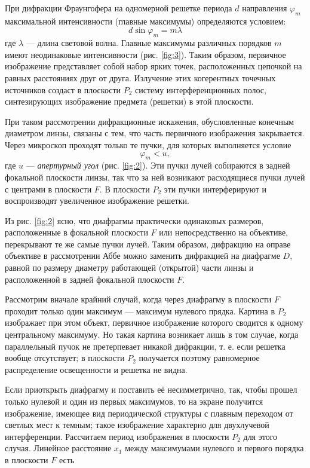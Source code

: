 \documentclass[a4paper, 12pt]{article}
\begin{document}
	При дифракции Фраунгофера на одномерной решетке периода $d$ направления $\varphi_m$ максимальной интенсивности (главные максимумы) определяются условием:
	\begin{equation}
		d\sin\varphi_m=m\lambda
		\label{eq:1}
	\end{equation}
	где $\lambda$ — длина световой волна. Главные максимумы различных порядков $m$ имеют неодинаковые интенсивности (рис. \ref{fig:3}). Таким образом, первичное изображение представляет собой набор ярких точек, расположенных цепочкой на равных расстояниях друг от друга. Излучение этих когерентных точечных источников создаст в плоскости $P_2$ систему интерференционных полос, синтезирующих изображение предмета (решетки) в этой плоскости.\par
	При таком рассмотрении дифракционные искажения, обусловленные конечным диаметром линзы, связаны с тем, что часть первичного изображения закрывается. Через микроскоп проходят только те пучки, для которых выполняется условие
	\begin{equation}
		\varphi_m<u,
	\end{equation}
	где $u$ — \textit{апертурный угол} (рис. \ref{fig:2}). Эти пучки лучей собираются в задней фокальной плоскости линзы, так что за ней возникают расходящиеся пучки лучей с центрами в плоскости $F$. В плоскости $P_2$ эти пучки интерферируют и воспроизводят увеличенное изображение решетки.\par
	Из рис. \ref{fig:2} ясно, что диафрагмы практически одинаковых размеров, расположенные в фокальной плоскости $F$ или непосредственно на объективе, перекрывают те же самые пучки лучей. Таким образом, дифракцию на оправе объективе в рассмотрении Аббе можно заменить дифракцией на диафрагме $D$, равной по размеру диаметру работающей (открытой) части линзы и расположенной в задней фокальной плоскости $F$.\par
	Рассмотрим вначале крайний случай, когда через диафрагму в плоскости $F$ проходит только один максимум — максимум нулевого прядка. Картина в $P_2$ изображает при этом объект, первичное изображение которого сводится к одному центральному максимуму. Но такая картина возникает лишь в том случае, когда параллельный пучок не претерпевает никакой дифракции, т. е. если решетка вообще отсутствует; в плоскости $P_2$ получается поэтому равномерное распределение освещенности и решетка не видна.\par
	Если приоткрыть диафрагму и поставить её несимметрично, так, чтобы прошел только нулевой и один из первых максимумов, то на экране получится изображение, имеющее вид периодической структуры с плавным переходом от светлых мест к темным; такое изображение характерно для двухлучевой интерференции. Рассчитаем период изображения в плоскости $P_2$ для этого случая. Линейное расстояние $x_1$ между максимумами нулевого и первого порядка в плоскости $F$ есть
\end{document}
